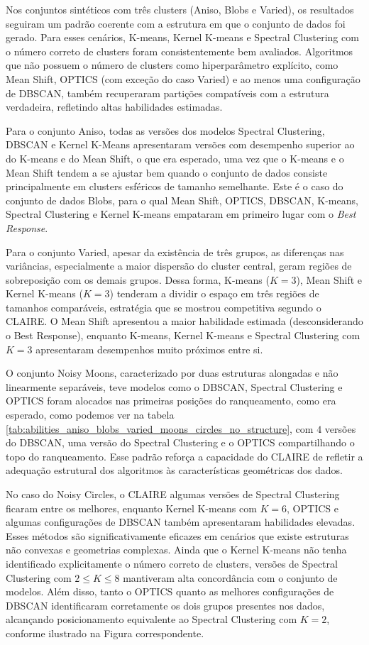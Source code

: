 Nos conjuntos sintéticos com três clusters (Aniso, Blobs e Varied), os resultados seguiram um padrão coerente com a estrutura em que o conjunto de dados foi gerado. Para esses cenários, K-means, Kernel K-means e Spectral Clustering com o número correto de clusters foram consistentemente bem avaliados. Algoritmos que não possuem o número de clusters como hiperparâmetro explícito, como Mean Shift, OPTICS (com exceção do caso Varied) e ao menos uma configuração de DBSCAN, também recuperaram partições compatíveis com a estrutura verdadeira, refletindo altas habilidades estimadas.

Para o conjunto Aniso, todas as versões dos modelos Spectral Clustering, DBSCAN e Kernel K-Means apresentaram versões com desempenho superior ao do K-means e do Mean Shift, o que era esperado, uma vez que o K-means e o Mean Shift tendem a se ajustar bem quando o conjunto de dados consiste principalmente em clusters esféricos de tamanho semelhante. Este é o caso do conjunto de dados Blobs, para o qual Mean Shift, OPTICS, DBSCAN, K-means, Spectral Clustering e Kernel K-means empataram em primeiro lugar com o \textit{Best Response}.

Para o conjunto Varied, apesar da existência de três grupos, as diferenças nas variâncias, especialmente a maior dispersão do cluster central, geram regiões de sobreposição com os demais grupos. Dessa forma, K-means ($K=3$), Mean Shift e Kernel K-means ($K=3$) tenderam a dividir o espaço em três regiões de tamanhos comparáveis, estratégia que se mostrou competitiva segundo o \gls{CLAIRE}. O Mean Shift apresentou a maior habilidade estimada (desconsiderando o Best Response), enquanto K-means, Kernel K-means e Spectral Clustering com $K=3$ apresentaram desempenhos muito próximos entre si.

O conjunto Noisy Moons, caracterizado por duas estruturas alongadas e não linearmente separáveis, teve modelos como o DBSCAN, Spectral Clustering e OPTICS foram alocados nas primeiras posições do ranqueamento, como era esperado, como podemos ver na tabela \ref{tab:abilities_aniso_blobs_varied_moons_circles_no_structure}, com $4$ versões do DBSCAN, uma versão do Spectral Clustering e o OPTICS compartilhando o topo do ranqueamento. Esse padrão reforça a capacidade do CLAIRE de refletir a adequação estrutural dos algoritmos às características geométricas dos dados.

No caso do Noisy Circles, o \gls{CLAIRE} algumas versões de Spectral Clustering ficaram entre os melhores, enquanto Kernel K-means com $K=6$, OPTICS e algumas configurações de DBSCAN também apresentaram habilidades elevadas. Esses métodos são significativamente eficazes em cenários que existe estruturas não convexas e geometrias complexas. Ainda que o Kernel K-means não tenha identificado explicitamente o número correto de clusters, versões de Spectral Clustering com $2 \leq K \leq 8$ mantiveram alta concordância com o conjunto de modelos. Além disso, tanto o OPTICS quanto as melhores configurações de DBSCAN identificaram corretamente os dois grupos presentes nos dados, alcançando posicionamento equivalente ao Spectral Clustering com $K=2$, conforme ilustrado na Figura correspondente.

